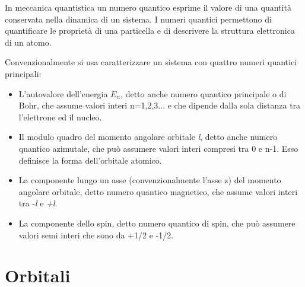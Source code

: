 \documentclass[10pt,a4paper]{article}
\begin{document}
In meccanica quantistica un numero quantico esprime il valore di una quantità conservata nella dinamica di un sistema. I numeri quantici permettono di quantificare le proprietà di una particella e di descrivere la struttura elettronica di un atomo.

Convenzionalmente si usa caratterizzare un sistema con quattro numeri quantici principali:

\begin{itemize}


\item L'autovalore dell'energia $E_{n}$, detto anche numero quantico principale o di Bohr, che assume valori interi n=1,2,3... e che dipende dalla sola distanza tra l'elettrone ed il nucleo.

\item Il modulo quadro del momento angolare orbitale \textit{l}, detto anche numero quantico azimutale, che può assumere valori interi compresi tra 0 e n-1. Esso definisce la forma dell'orbitale atomico.

\item La componente lungo un asse (convenzionalmente l'asse z) del momento angolare orbitale, detto numero quantico magnetico, che assume valori interi tra -\textit{l} e \textit{+l}.

\item La componente dello spin, detto numero quantico di spin, che può assumere valori semi interi che sono da +1/2 e -1/2.	
\end{itemize}

\section{Orbitali}
	
\end{document}
